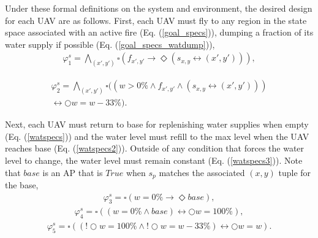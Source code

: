 \documentclass{ieeeaccess}
\newcommand{\always}{\square}
\newcommand{\eventually}{\Diamond}
\newcommand{\next}{\bigcirc}
\begin{document}
Under these formal definitions on the system and environment, the desired design for each UAV are as follows. First, each UAV must fly to any region in the state space associated with an active fire (Eq. (\ref{goal_specs})), dumping a fraction of its water supply if possible (Eq. (\ref{goal_specs_watdump})),
\begin{equation}
\begin{aligned}
\varphi_{1}^{s} = \bigwedge_{(x',y')} \always (f_{x',y'} \longrightarrow \eventually (s_{x,y} \leftrightarrow (x', y'))),
\end{aligned}
\label{goal_specs}
\end{equation}

\begin{equation}
\begin{aligned}
\varphi_{2}^{s} = \bigwedge_{(x',y')} \always ((w > 0\% \land f_{x',y'} \land (s_{x,y} \leftrightarrow (x', y'))) \\ \leftrightarrow \next w = w - 33 \%).
\end{aligned}
\label{goal_specs_watdump}
\end{equation}

Next, each UAV must return to base for replenishing water supplies when empty (Eq. (\ref{watspecs})) and the water level must refill to the max level when the UAV reaches base (Eq. (\ref{watspecs2})). Outside of any condition that forces the water level to change, the water level must remain constant (Eq. (\ref{watspecs3})). Note that $base$ is an AP that is $True$ when $s_p$ matches the associated $(x,y)$ tuple for the base,
\begin{equation}
\begin{aligned}
\varphi_{3}^{s} = \always (w = 0\% \longrightarrow \eventually base) ,
\end{aligned}
\label{watspecs}
\end{equation}
\begin{equation}
\begin{aligned}
\varphi_{4}^{s} = \always ((w = 0\% \land base) \leftrightarrow \next w = 100\%),
\end{aligned}
\label{watspecs2}
\end{equation}
\begin{equation}
\begin{aligned}
\varphi_{5}^{s} = \always ((!\next w = 100\% \land !\next w = w - 33 \%) \leftrightarrow \next w = w).
\end{aligned}
\label{watspecs3}
\end{equation}
\end{document}
